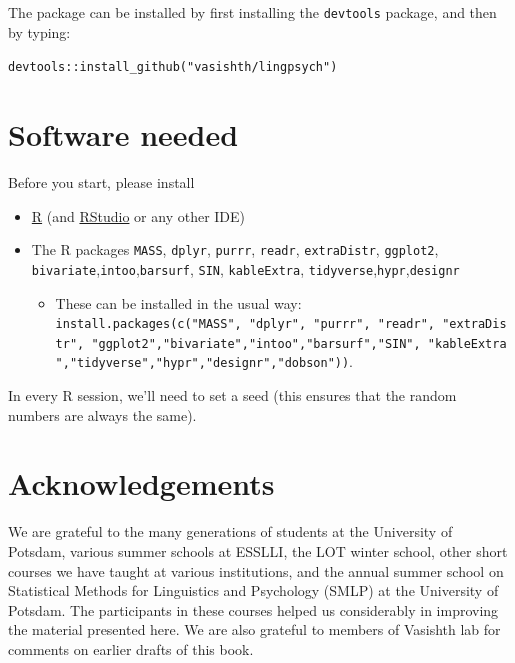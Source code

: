 \documentclass[
  12pt,
]{krantz}
\providecommand{\tightlist}{%
  \setlength{\itemsep}{0pt}\setlength{\parskip}{0pt}}
\theoremstyle{definition}
\theoremstyle{definition}
\theoremstyle{definition}
\theoremstyle{definition}
\theoremstyle{remark}
\begin{document}
The package can be installed by first installing the \texttt{devtools} package, and then by typing:

\texttt{devtools::install\_github("vasishth/lingpsych")}

\hypertarget{software-needed}{%
\section*{Software needed}\label{software-needed}}


Before you start, please install

\begin{itemize}
\tightlist
\item
  \href{https://cran.r-project.org/}{R} (and \href{https://www.rstudio.com/}{RStudio} or any other IDE)
\item
  The R packages \texttt{MASS}, \texttt{dplyr}, \texttt{purrr}, \texttt{readr}, \texttt{extraDistr}, \texttt{ggplot2}, \texttt{bivariate},\texttt{intoo},\texttt{barsurf}, \texttt{SIN}, \texttt{kableExtra}, \texttt{tidyverse},\texttt{hypr},\texttt{designr}

  \begin{itemize}
  \tightlist
  \item
    These can be installed in the usual way: \texttt{install.packages(c("MASS",\ "dplyr",\ "purrr",\ "readr",\ "extraDistr",\ "ggplot2","bivariate","intoo","barsurf","SIN",\ "kableExtra","tidyverse","hypr","designr","dobson"))}.
  \end{itemize}
\end{itemize}

In every R session, we'll need to set a seed (this ensures that the random numbers are always the same).

\hypertarget{acknowledgements}{%
\section*{Acknowledgements}\label{acknowledgements}}


We are grateful to the many generations of students at the University of Potsdam, various summer schools at ESSLLI, the LOT winter school, other short courses we have taught at various institutions, and the annual summer school on Statistical Methods for Linguistics and Psychology (SMLP) at the University of Potsdam. The participants in these courses helped us considerably in improving the material presented here. We are also grateful to members of Vasishth lab for comments on earlier drafts of this book.
\end{document}
